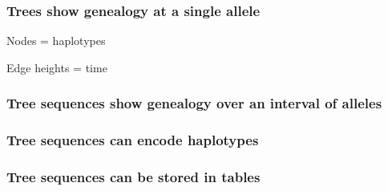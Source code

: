 \documentclass[11pt, mathserif, aspectratio=169]{beamer}
\newcommand{\magenta}[1]{\textcolor{magenta}{#1}}
\newenvironment{wideitemize}{\itemize\addtolength{\itemsep}{10pt}}{\enditemize}
\begin{document}
\begin{frame}
\frametitle{Trees show genealogy at a single allele}
\begin{minipage}{.48\textwidth}
\begin{center}

\end{center}
\end{minipage}\hfill
\begin{minipage}{.48\textwidth}
\begin{wideitemize}
\item Nodes = haplotypes
\item Edge heights = time
\end{wideitemize}
\end{minipage}
\end{frame}

\begin{frame}
\frametitle{Tree sequences show genealogy over an interval of alleles}
\begin{center}

\end{center}
\end{frame}

\begin{frame}
\frametitle{Tree sequences can encode haplotypes}
\begin{center}

\end{center}
\end{frame}

\begin{frame}
\frametitle{Tree sequences can be stored in tables}
\hspace{-1.5cm}
\begin{minipage}{.48\textwidth}
\begin{center}

\end{center}
\end{minipage}\hfill
\begin{minipage}{.48\textwidth}
\begin{center}

\end{center}
\end{minipage}
\end{frame}
\end{document}

